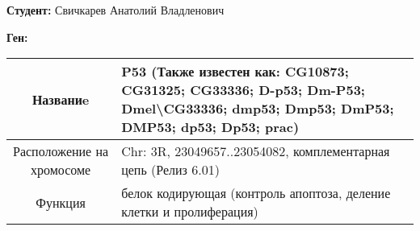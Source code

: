 \documentclass{article} %
\begin{document}
\textbf{Студент:} Свичкарев Анатолий Владленович

\textbf{Ген:}
\begin{center}
	\begin{tabularx}{\textwidth}{|c|Y|} \hline
		Названиe & \textbf{P53} (Также известен как: CG10873; CG31325;
			   CG33336; D-p53; Dm-P53; Dmel\textbackslash CG33336;
			   dmp53; Dmp53; DmP53; DMP53; dp53; Dp53; prac) \\ \hline
		Расположение на хромосоме & Chr: 3R, 23049657..23054082,
			   		    комплементарная цепь (Релиз 6.01)\\ \hline
		Функция & белок кодирующая (контроль апоптоза,
			  деление клетки и пролиферация)\\ \hline
	\end{tabularx}
\end{center}
\end{document}
